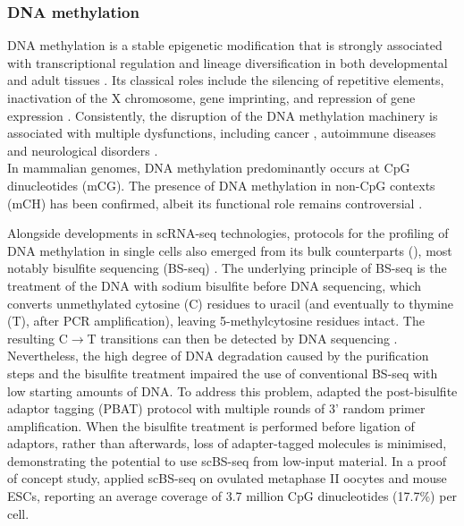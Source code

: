 \subsubsection{DNA methylation} \label{section:dna_methylation}
DNA methylation is a stable epigenetic modification that is strongly associated with transcriptional regulation and lineage diversification in both developmental and adult tissues \cite{Jin2018, Harrison2011, Lee2014, Smith2013}. Its classical roles include the silencing of repetitive elements, inactivation of the X chromosome, gene imprinting, and repression of gene expression \cite{Jones2012}. Consistently, the disruption of the DNA methylation machinery is associated with multiple dysfunctions, including cancer \cite{Baylin2011}, autoimmune diseases \cite{Liu2013} and neurological disorders \cite{Amir1999}.\\
In mammalian genomes, DNA methylation predominantly occurs at CpG dinucleotides (mCG). The presence of DNA methylation in non-CpG contexts (mCH) has been confirmed, albeit its functional role remains controversial \cite{He2015, Ramsahoye2000, Lister2009}.

Alongside developments in scRNA-seq technologies, protocols for the profiling of DNA methylation in single cells also emerged from its bulk counterparts (), most notably bisulfite sequencing (BS-seq) \cite{Smallwood2014,Guo2013,Gravina2016,Farlik2015}. The underlying principle of BS-seq is the treatment of the DNA with sodium bisulfite before DNA sequencing, which converts unmethylated cytosine (C) residues to uracil (and eventually to thymine (T), after PCR amplification), leaving 5-methylcytosine residues intact. The resulting C$\to$T transitions can then be detected by DNA sequencing \cite{Frommer1992,Clark2016,Clark2017}. Nevertheless, the high degree of DNA degradation caused by the purification steps and the bisulfite treatment impaired the use of conventional BS-seq with low starting amounts of DNA. To address this problem, \cite{Smallwood2014} adapted the post-bisulfite adaptor tagging (PBAT) protocol with multiple rounds of 3' random primer amplification. When the bisulfite treatment is performed before ligation of adaptors, rather than afterwards, loss of adapter-tagged molecules is minimised, demonstrating the potential to use scBS-seq from low-input material. In a proof of concept study, \cite{Smallwood2014} applied scBS-seq on ovulated metaphase II oocytes and mouse ESCs, reporting an average coverage of 3.7 million CpG dinucleotides (17.7\%) per cell.

